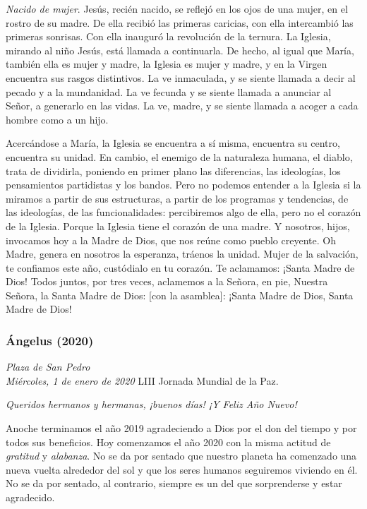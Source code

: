 \emph{Nacido de mujer}. Jesús, recién nacido, se reflejó en los ojos de una mujer, en el rostro de su madre. De ella recibió las primeras caricias, con ella intercambió las primeras sonrisas. Con ella inauguró la revolución de la ternura. La Iglesia, mirando al niño Jesús, está llamada a continuarla. De hecho, al igual que María, también ella es mujer y madre, la Iglesia es mujer y madre, y en la Virgen encuentra sus rasgos distintivos. La ve inmaculada, y se siente llamada a decir  al pecado y a la mundanidad. La ve fecunda y se siente llamada a anunciar al Señor, a generarlo en las vidas. La ve, madre, y se siente llamada a acoger a cada hombre como a un hijo.

Acercándose a María, la Iglesia se encuentra a sí misma, encuentra su centro, encuentra su unidad. En cambio, el enemigo de la naturaleza humana, el diablo, trata de dividirla, poniendo en primer plano las diferencias, las ideologías, los pensamientos partidistas y los bandos. Pero no podemos entender a la Iglesia si la miramos a partir de sus estructuras, a partir de los programas y tendencias, de las ideologías, de las funcionalidades: percibiremos algo de ella, pero no el corazón de la Iglesia. Porque la Iglesia tiene el corazón de una madre. Y nosotros, hijos, invocamos hoy a la Madre de Dios, que nos reúne como pueblo creyente. Oh Madre, genera en nosotros la esperanza, tráenos la unidad. Mujer de la salvación, te confiamos este año, custódialo en tu corazón. Te aclamamos: ¡Santa Madre de Dios! Todos juntos, por tres veces, aclamemos a la Señora, en pie, Nuestra Señora, la Santa Madre de Dios: {[}con la asamblea{]}: ¡Santa Madre de Dios, Santa Madre de Dios!


\subsubsection{Ángelus (2020)} 

\emph{Plaza de San Pedro\\ Miércoles, 1 de enero de 2020}
LIII Jornada Mundial de la Paz.


\emph{Queridos hermanos y hermanas, ¡buenos días! ¡Y Feliz Año Nuevo!}

Anoche terminamos el año 2019 agradeciendo a Dios por el don del tiempo y por todos sus beneficios. Hoy comenzamos el año 2020 con la misma actitud de \emph{gratitud} y \emph{alabanza}. No se da por sentado que nuestro planeta ha comenzado una nueva vuelta alrededor del sol y que los seres humanos seguiremos viviendo en él. No se da por sentado, al contrario, siempre es un  del que sorprenderse y estar agradecido.

